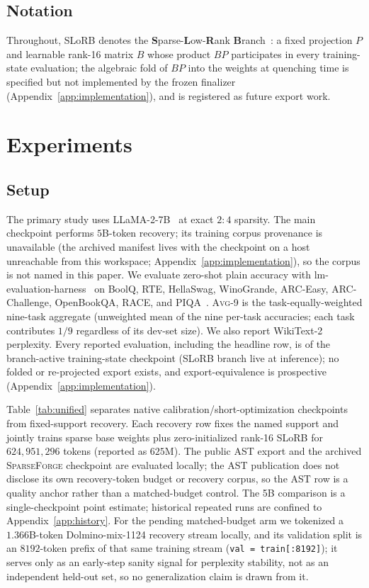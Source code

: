 \documentclass{article}
\newcommand{\method}{\textsc{SparseForge}}
\newcommand{\taskavg}{\textsc{Avg}-9}
\begin{document}
\subsection{Notation}
Throughout, SLoRB denotes the \textbf{S}parse-\textbf{L}ow-\textbf{R}ank
\textbf{B}ranch~\citep{huang2025ast}: a fixed projection $P$ and learnable
rank-16 matrix $B$ whose product $B P$ participates in every training-state
evaluation; the algebraic fold of $B P$ into the weights at quenching time is
specified but not implemented by the frozen finalizer (Appendix~\ref{app:implementation}),
and is registered as future export work.

\section{Experiments}
\subsection{Setup}
The primary study uses LLaMA-2-7B~\citep{touvron2023llama2} at exact $2{:}4$ sparsity. The main checkpoint performs $5$B-token recovery; its training corpus provenance is unavailable (the archived manifest lives with the checkpoint on a host unreachable from this workspace; Appendix~\ref{app:implementation}), so the corpus is not named in this paper. We evaluate zero-shot plain accuracy with lm-evaluation-harness~\citep{biderman2024lmeval} on BoolQ, RTE, HellaSwag, WinoGrande, ARC-Easy, ARC-Challenge, OpenBookQA, RACE, and PIQA~\citep{clark2019boolq,wang2019superglue,zellers2019hellaswag,sakaguchi2021winogrande,clark2018arc,mihaylov2018openbookqa,lai2017race,bisk2020piqa}. \taskavg{} is the task-equally-weighted nine-task aggregate (unweighted mean of the nine per-task accuracies; each task contributes $1/9$ regardless of its dev-set size). We also report WikiText-2 perplexity. Every reported evaluation, including the headline row, is of the branch-active training-state checkpoint (SLoRB branch live at inference); no folded or re-projected export exists, and export-equivalence is prospective (Appendix~\ref{app:implementation}).

Table~\ref{tab:unified} separates native calibration/short-optimization checkpoints from fixed-support recovery. Each recovery row fixes the named support and jointly trains sparse base weights plus zero-initialized rank-16 SLoRB for $624{,}951{,}296$ tokens (reported as $625$M). The public AST export and the archived \method{} checkpoint are evaluated locally; the AST publication does not disclose its own recovery-token budget or recovery corpus, so the AST row is a quality anchor rather than a matched-budget control. The 5B comparison is a single-checkpoint point estimate; historical repeated runs are confined to Appendix~\ref{app:history}. For the pending matched-budget arm we tokenized a $1.366$B-token Dolmino-mix-1124 recovery stream locally, and its validation split is an $8192$-token prefix of that same training stream (\texttt{val = train[:8192]}); it serves only as an early-step sanity signal for perplexity stability, not as an independent held-out set, so no generalization claim is drawn from it.
\end{document}
